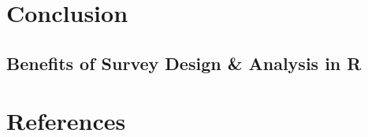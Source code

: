 \documentclass[
  letterpaper,
  DIV=11,
  numbers=noendperiod]{scrreprt}
\newlength{\cslhangindent}
\newlength{\cslentryspacingunit} %
\newenvironment{CSLReferences}[2] %
 {%
  \setlength{\parindent}{0pt}
  \ifodd #1
  \let\oldpar\par
  \def\par{\hangindent=\cslhangindent\oldpar}
  \fi
  \setlength{\parskip}{#2\cslentryspacingunit}
 }%
 {}
\begin{document}

\hypertarget{conclusion}{%
\chapter{Conclusion}\label{conclusion}}

\hypertarget{benefits-of-survey-design-analysis-in-r}{%
\section{Benefits of Survey Design \& Analysis in
R}\label{benefits-of-survey-design-analysis-in-r}}


\hypertarget{references}{%
\chapter*{References}\label{references}}

\hypertarget{refs}{}
\begin{CSLReferences}{0}{0}
\end{CSLReferences}
\end{document}
